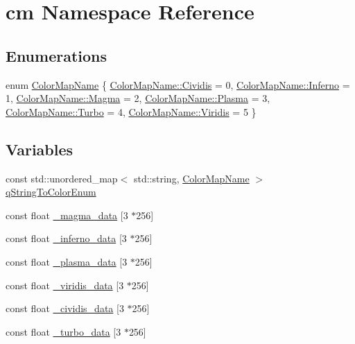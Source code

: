 \hypertarget{namespacecm}{}\section{cm Namespace Reference}
\label{namespacecm}
\subsection*{Enumerations}
\begin{DoxyCompactItemize}
\item 
enum \hyperlink{namespacecm_aabaf84796e8a93bd6adca4c5bdea5311}{Color\+Map\+Name} \{ \newline
\hyperlink{namespacecm_aabaf84796e8a93bd6adca4c5bdea5311a64c2ad47aeb457c258518a5318ed071d}{Color\+Map\+Name\+::\+Cividis} = 0, 
\hyperlink{namespacecm_aabaf84796e8a93bd6adca4c5bdea5311a8bb279f735c1d9c831e935cca2613b58}{Color\+Map\+Name\+::\+Inferno} = 1, 
\hyperlink{namespacecm_aabaf84796e8a93bd6adca4c5bdea5311a1b62e99f86d45e754e5e79d9fa9dfcde}{Color\+Map\+Name\+::\+Magma} = 2, 
\hyperlink{namespacecm_aabaf84796e8a93bd6adca4c5bdea5311ab20a4217acaf4316739c6a5f6679ef60}{Color\+Map\+Name\+::\+Plasma} = 3, 
\newline
\hyperlink{namespacecm_aabaf84796e8a93bd6adca4c5bdea5311a6f53bfe04e78da893ba0c4f35ba6847e}{Color\+Map\+Name\+::\+Turbo} = 4, 
\hyperlink{namespacecm_aabaf84796e8a93bd6adca4c5bdea5311a951ee92ee5e947e1e7e1cb6376523c1a}{Color\+Map\+Name\+::\+Viridis} = 5
 \}
\end{DoxyCompactItemize}
\subsection*{Variables}
\begin{DoxyCompactItemize}
\item 
const std\+::unordered\+\_\+map$<$ std\+::string, \hyperlink{namespacecm_aabaf84796e8a93bd6adca4c5bdea5311}{Color\+Map\+Name} $>$ \hyperlink{namespacecm_a15083c75e20e3cb25b34ac29a4d66413}{q\+String\+To\+Color\+Enum}
\item 
const float \hyperlink{namespacecm_a6c7ebc740c952f5ae2569bbc4d6b0ba3}{\+\_\+magma\+\_\+data} \mbox{[}3 $\ast$256\mbox{]}
\item 
const float \hyperlink{namespacecm_abd85098a9455ec3b6a1367e717904d81}{\+\_\+inferno\+\_\+data} \mbox{[}3 $\ast$256\mbox{]}
\item 
const float \hyperlink{namespacecm_a5e6bdf45c99146f14941db900036b42c}{\+\_\+plasma\+\_\+data} \mbox{[}3 $\ast$256\mbox{]}
\item 
const float \hyperlink{namespacecm_af931122787ac6cf5d5c8d834adcb3fc8}{\+\_\+viridis\+\_\+data} \mbox{[}3 $\ast$256\mbox{]}
\item 
const float \hyperlink{namespacecm_a9aebd281c6d694ef79eb8f989866ff6d}{\+\_\+cividis\+\_\+data} \mbox{[}3 $\ast$256\mbox{]}
\item 
const float \hyperlink{namespacecm_a1394411b557deb7b6f8c58a9c39ff4a3}{\+\_\+turbo\+\_\+data} \mbox{[}3 $\ast$256\mbox{]}
\end{DoxyCompactItemize}


